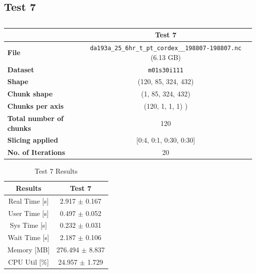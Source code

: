 \documentclass{article}
\begin{document}
\break
\subsection{Test 7}

\begin{table}[h!] 
    \centering 
    \begin{tabular}{lc}  \hline
                                        & Test 7                                         \\ \hline
        \textbf{File}                   & \texttt{da193a\_25\_6hr\_t\_pt\_cordex\_\_198807-198807.nc} (6.13 GB)   \\  
        \textbf{Dataset}                &\texttt{ m01s30i111  }                         \\ 
        \textbf{Shape}                  & (120, 85, 324, 432)                             \\ 
        \textbf{Chunk shape}            & (1, 85, 324, 432)                              \\ 
        \textbf{Chunks per axis}        &  (120, 1, 1, 1) )                               \\ 
        \textbf{Total number of chunks} & 120                                             \\ 
        \textbf{Slicing applied}        & [0:4, 0:1, 0:30, 0:30]                         \\ 
        \textbf{No. of Iterations}      & 20                                             \\  \hline
    \end{tabular}
    \caption{} 
    \label{tab:T7_Conditions} 
\end{table}

\begin{table}[h!]
    \centering
    \begin{tabular}{cc}
        \hline
        \textbf{Results} & Test 7              \\ \hline
        Real Time [s]    & 2.917 $\pm$ 0.167  \\
        User Time [s]    & 0.497 $\pm$ 0.052  \\
        Sys Time [s]     & 0.232 $\pm$ 0.031  \\
        Wait Time [s]    & 2.187 $\pm$ 0.106  \\
        Memory [MB]      & 276.494 $\pm$ 8.837\\
        CPU Util [\%]    & 24.957 $\pm$ 1.729 \\
        \hline
    \end{tabular}
    \caption{Test 7 Results}
    \label{tab:T7_Results}
\end{table}
\end{document}
